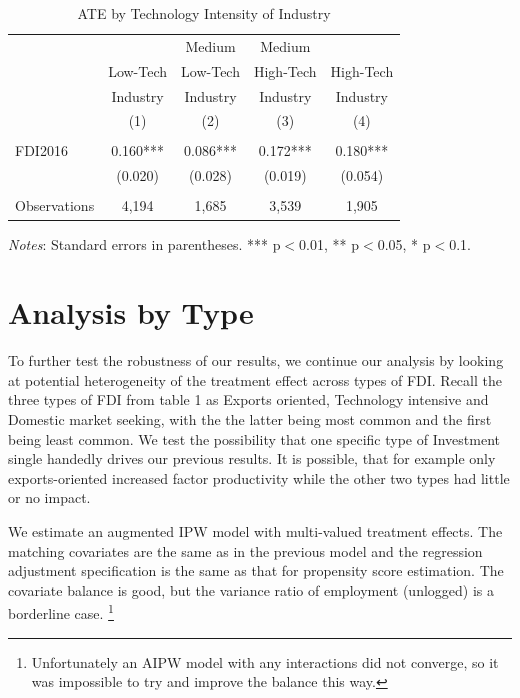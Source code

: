 \documentclass[a4paper,11pt]{scrartcl}
\begin{document}
\begin{table}[h]
  \centering
   \caption{ATE by Technology Intensity of Industry}
   \label{tab:TECH}
\begin{threeparttable}
 
\begin{tabular}{lcccc}
 \hline
 \hline
 & & Medium & Medium &  \\ 
 & Low-Tech & Low-Tech & High-Tech & High-Tech \\ 
 & Industry & Industry & Industry & Industry \\ 
 & (1) & (2) & (3) & (4) \\
 \hline
 &  &  &  &  \\
FDI2016 & 0.160*** & 0.086*** & 0.172*** & 0.180*** \\
	      & (0.020) & (0.028) & (0.019) & (0.054) \\
	      &  &  &  &  \\
 Observations & 4,194 & 1,685 & 3,539 & 1,905 \\ 
	\hline
	\hline
\end{tabular}

\begin{tablenotes}[flushleft]
     \footnotesize
\item \textit{Notes}: Standard errors in parentheses. *** p$<$0.01, ** p$<$0.05, * p$<$0.1.    
\end{tablenotes}

\end{threeparttable}
\end{table}


\section{Analysis by Type}


To further test the robustness of our results, we continue our analysis by looking at potential heterogeneity of the treatment effect across types of FDI. Recall the three types of FDI from table 1 as Exports oriented, Technology intensive and Domestic market seeking, with the the latter being most common and the first being least common.
We test the possibility that one specific type of Investment single handedly drives our previous results.  It is possible, that for example only exports-oriented increased factor productivity while the other two types had little or no impact. 

We estimate an augmented IPW model with multi-valued treatment effects. The matching covariates are the same as in the previous model and the regression adjustment specification is the same as that for propensity score estimation. The covariate balance is good, but the variance ratio of employment (unlogged) is a borderline case. \footnote{Unfortunately an AIPW model with any interactions did not converge, so it was impossible to try and improve the balance this way.}%
\end{document}
